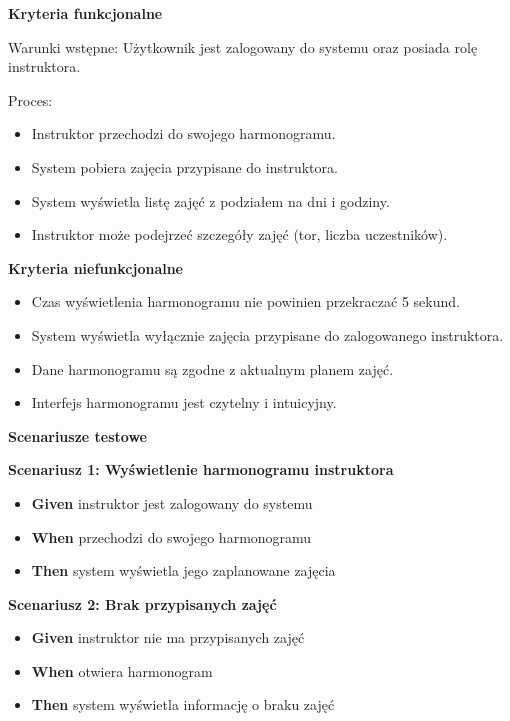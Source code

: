 \documentclass[a4paper,12pt]{article}
\begin{document}
\noindent \textbf{Kryteria funkcjonalne}

\vspace{0,2cm}

\noindent Warunki wstępne: Użytkownik jest zalogowany do systemu oraz posiada rolę instruktora.

\vspace{0,2cm}

\noindent Proces:

\begin{itemize}
    \item Instruktor przechodzi do swojego harmonogramu.
    \item System pobiera zajęcia przypisane do instruktora.
    \item System wyświetla listę zajęć z podziałem na dni i godziny.
    \item Instruktor może podejrzeć szczegóły zajęć (tor, liczba uczestników).
\end{itemize}

\noindent \textbf{Kryteria niefunkcjonalne}
\begin{itemize}
    \item Czas wyświetlenia harmonogramu nie powinien przekraczać 5 sekund.
    \item System wyświetla wyłącznie zajęcia przypisane do zalogowanego instruktora.
    \item Dane harmonogramu są zgodne z aktualnym planem zajęć.
    \item Interfejs harmonogramu jest czytelny i intuicyjny.
\end{itemize}

\noindent \textbf{Scenariusze testowe}

\textbf{Scenariusz 1: Wyświetlenie harmonogramu instruktora}
\begin{itemize}
    \item \textbf{Given} instruktor jest zalogowany do systemu
    \item \textbf{When} przechodzi do swojego harmonogramu
    \item \textbf{Then} system wyświetla jego zaplanowane zajęcia
\end{itemize}

\textbf{Scenariusz 2: Brak przypisanych zajęć}
\begin{itemize}
    \item \textbf{Given} instruktor nie ma przypisanych zajęć
    \item \textbf{When} otwiera harmonogram
    \item \textbf{Then} system wyświetla informację o braku zajęć
\end{itemize}
\end{document}
